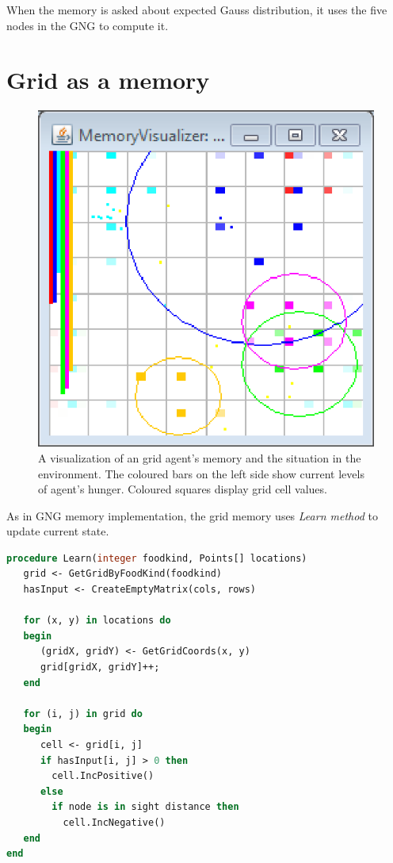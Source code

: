 When the memory is asked about expected Gauss distribution, it uses the five nodes in the GNG to compute it.

\section{Grid as a memory}

\begin{figure}      
\begin{center}
\includegraphics{images/app/grid_screenshot.eps}    
\caption{A visualization of an grid agent's memory and the situation in the environment. The coloured bars on the left side show current levels of agent's hunger. Coloured squares display grid cell values.}
\end{center}                          
\label{app:gridscreenshot}
\end{figure}

As in GNG memory implementation, the grid memory uses \emph{Learn method} to update current state. 

\begin{lstlisting}[language=Pascal]
procedure Learn(integer foodkind, Points[] locations)
   grid <- GetGridByFoodKind(foodkind)
   hasInput <- CreateEmptyMatrix(cols, rows)
   
   for (x, y) in locations do
   begin
      (gridX, gridY) <- GetGridCoords(x, y)
      grid[gridX, gridY]++;
   end 
   
   for (i, j) in grid do
   begin
      cell <- grid[i, j]
      if hasInput[i, j] > 0 then
        cell.IncPositive()
      else
        if node is in sight distance then
          cell.IncNegative()
   end
end
\end{lstlisting}  

